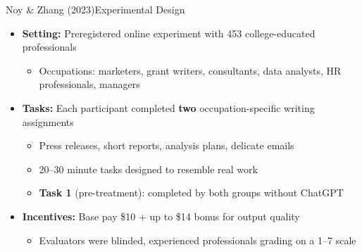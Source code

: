 \documentclass[hyperref={pdfpagelabels=false}]{beamer}
\begin{document}
\begin{frame}{Noy \& Zhang (2023)}{Experimental Design}
	\begin{itemize}
		\item \textbf{Setting:} Preregistered online experiment with 453 college-educated professionals
		\vspace{0.2cm}
		\begin{itemize}
			\item Occupations: marketers, grant writers, consultants, data analysts, HR professionals, managers
		\end{itemize}
		\vspace{0.2cm}
		\item \textbf{Tasks:} Each participant completed \textbf{two} occupation-specific writing assignments
		\vspace{0.2cm}
		\begin{itemize}
			\item Press releases, short reports, analysis plans, delicate emails
		\vspace{0.2cm}


			\item 20--30 minute tasks designed to resemble real work
            		\vspace{0.2cm}

			\item \textbf{Task 1} (pre-treatment): completed by both groups without ChatGPT
		\end{itemize}
		\vspace{0.2cm}
		\item \textbf{Incentives:} Base pay \$10 + up to \$14 bonus for output quality
		\vspace{0.2cm}
		\begin{itemize}
			\item Evaluators were blinded, experienced professionals grading on a 1--7 scale
		\end{itemize}
	\end{itemize}
\end{frame}
\end{document}
